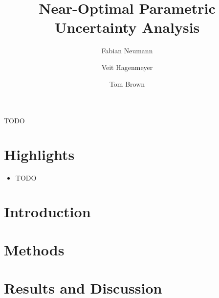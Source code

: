 \documentclass[1p,11pt]{elsarticle}
\begin{document}
\begin{frontmatter}

	\title{Near-Optimal Parametric Uncertainty Analysis}
	
	\author[kitaddress]{Fabian Neumann}
	\author[kitaddress]{Veit Hagenmeyer}
	\author[kitaddress]{Tom Brown}
	\address[kitaddress]{Institute for Automation and Applied Informatics (IAI), Karlsruhe Institute of Technology (KIT), Hermann-von-Helmholtz-Platz 1, 76344, Eggenstein-Leopoldshafen, Germany}

	\begin{abstract}
		
	\end{abstract}

	\begin{keyword}
		TODO
	\end{keyword}

\end{frontmatter}

\begin{small}
	\tableofcontents
\end{small}

\section*{Highlights}

\begin{itemize}
	\item TODO
\end{itemize}

\section{Introduction}
\label{sec:intro}



\section{Methods}
\label{sec:methods}



\section{Results and Discussion}
\label{sec:results}
\end{document}
